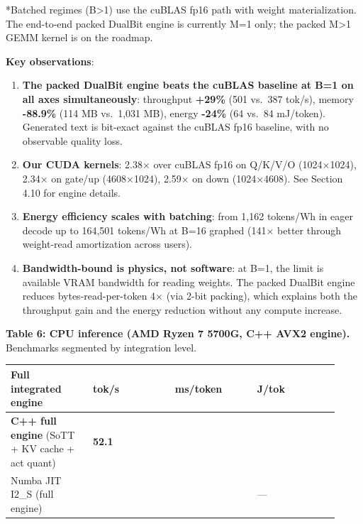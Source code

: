 *Batched regimes (B\textgreater1) use the cuBLAS fp16 path with weight
materialization. The end-to-end packed DualBit engine is currently M=1
only; the packed M\textgreater1 GEMM kernel is on the roadmap.

\textbf{Key observations}:

\begin{enumerate}
\def\labelenumi{\arabic{enumi}.}
\item
  \textbf{The packed DualBit engine beats the cuBLAS baseline at B=1 on
  all axes simultaneously}: throughput \textbf{+29\%} (501 vs.~387
  tok/s), memory \textbf{-88.9\%} (114 MB vs.~1,031 MB), energy
  \textbf{-24\%} (64 vs.~84 mJ/token). Generated text is bit-exact
  against the cuBLAS fp16 baseline, with no observable quality loss.
\item
  \textbf{Our CUDA kernels}: 2.38× over cuBLAS fp16 on Q/K/V/O
  (1024×1024), 2.34× on gate/up (4608×1024), 2.59× on down (1024×4608).
  See Section 4.10 for engine details.
\item
  \textbf{Energy efficiency scales with batching}: from 1,162 tokens/Wh
  in eager decode up to 164,501 tokens/Wh at B=16 graphed (141× better
  through weight-read amortization across users).
\item
  \textbf{Bandwidth-bound is physics, not software}: at B=1, the limit
  is available VRAM bandwidth for reading weights. The packed DualBit
  engine reduces bytes-read-per-token 4× (via 2-bit packing), which
  explains both the throughput gain and the energy reduction without any
  compute increase.
\end{enumerate}

\textbf{Table 6: CPU inference (AMD Ryzen 7 5700G, C++ AVX2 engine).}
Benchmarks segmented by integration level.

{\def\LTcaptype{none} %
{\footnotesize\setlength{\tabcolsep}{3pt}
\begin{longtable}[]{@{}>{\raggedright\arraybackslash}p{0.230\linewidth}>{\raggedright\arraybackslash}p{0.230\linewidth}>{\raggedright\arraybackslash}p{0.230\linewidth}>{\raggedright\arraybackslash}p{0.230\linewidth}@{}}
\toprule\noalign{}
Full integrated engine & tok/s & ms/token & J/tok \\
\midrule\noalign{}
\endhead
\bottomrule\noalign{}
\endlastfoot
\textbf{C++ full engine} (SoTT + KV cache + act quant) & \textbf{52.1} &
19.2 & 1.329 \\
Numba JIT I2\_S (full engine) & 46.8 & 21.4 & --- \\
\end{longtable}
}
}

